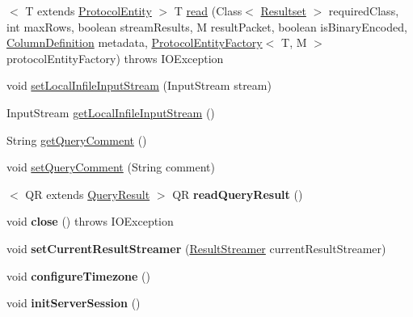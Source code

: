 \begin{DoxyCompactItemize}
\item 
$<$ T extends \mbox{\hyperlink{interfacecom_1_1mysql_1_1cj_1_1protocol_1_1_protocol_entity}{Protocol\+Entity}} $>$ T \mbox{\hyperlink{interfacecom_1_1mysql_1_1cj_1_1protocol_1_1_protocol_ae33a71067b314435408526d35f521207}{read}} (Class$<$ \mbox{\hyperlink{interfacecom_1_1mysql_1_1cj_1_1protocol_1_1_resultset}{Resultset}} $>$ required\+Class, int max\+Rows, boolean stream\+Results, M result\+Packet, boolean is\+Binary\+Encoded, \mbox{\hyperlink{interfacecom_1_1mysql_1_1cj_1_1protocol_1_1_column_definition}{Column\+Definition}} metadata, \mbox{\hyperlink{interfacecom_1_1mysql_1_1cj_1_1protocol_1_1_protocol_entity_factory}{Protocol\+Entity\+Factory}}$<$ T, M $>$ protocol\+Entity\+Factory)  throws I\+O\+Exception
\item 
void \mbox{\hyperlink{interfacecom_1_1mysql_1_1cj_1_1protocol_1_1_protocol_a995483a591a66d63e273140ef0ac47e7}{set\+Local\+Infile\+Input\+Stream}} (Input\+Stream stream)
\item 
Input\+Stream \mbox{\hyperlink{interfacecom_1_1mysql_1_1cj_1_1protocol_1_1_protocol_a14849c71b76edabc8dae60d7c22d9fee}{get\+Local\+Infile\+Input\+Stream}} ()
\item 
String \mbox{\hyperlink{interfacecom_1_1mysql_1_1cj_1_1protocol_1_1_protocol_a8a25c27a012f47ca25de357e65829884}{get\+Query\+Comment}} ()
\item 
void \mbox{\hyperlink{interfacecom_1_1mysql_1_1cj_1_1protocol_1_1_protocol_ace5604859b8b79df6dcf91bee7c1cc6c}{set\+Query\+Comment}} (String comment)
\item 
\mbox{\label{interfacecom_1_1mysql_1_1cj_1_1protocol_1_1_protocol_a4c6224539df13885a570b5865377ef01}} 
$<$ QR extends \mbox{\hyperlink{interfacecom_1_1mysql_1_1cj_1_1_query_result}{Query\+Result}} $>$ QR {\bfseries read\+Query\+Result} ()
\item 
\mbox{\label{interfacecom_1_1mysql_1_1cj_1_1protocol_1_1_protocol_ac38e74b2af853f10e7f9a97f6c4836f8}} 
void {\bfseries close} ()  throws I\+O\+Exception
\item 
\mbox{\label{interfacecom_1_1mysql_1_1cj_1_1protocol_1_1_protocol_a3923a0d582d653fae714775c3ae6db13}} 
void {\bfseries set\+Current\+Result\+Streamer} (\mbox{\hyperlink{interfacecom_1_1mysql_1_1cj_1_1protocol_1_1_result_streamer}{Result\+Streamer}} current\+Result\+Streamer)
\item 
\mbox{\label{interfacecom_1_1mysql_1_1cj_1_1protocol_1_1_protocol_a21ceb9181ddbbf615ead4ad2e24e5544}} 
void {\bfseries configure\+Timezone} ()
\item 
\mbox{\label{interfacecom_1_1mysql_1_1cj_1_1protocol_1_1_protocol_ab0e2c37f1f3ab785fee8c60abd7f9e9a}} 
void {\bfseries init\+Server\+Session} ()
\end{DoxyCompactItemize}


